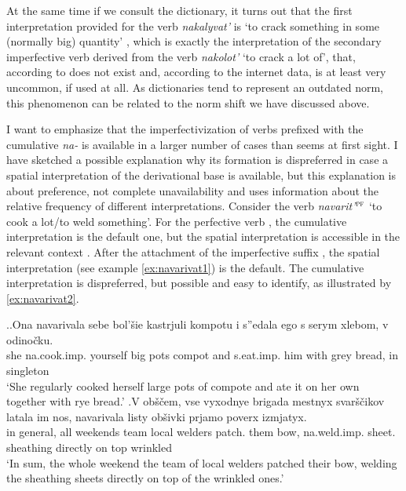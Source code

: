 At the same time if we consult the dictionary, it turns out that the first interpretation provided for the verb \textit{nakalyvat'} is `to crack something in some (normally big) quantity' \citep{Efremova:00}, which is exactly the interpretation of the secondary imperfective  verb  derived from the verb \textit{nakolot'} `to crack a lot of', that, according to \citet{Svenonius:04b} does not exist and, according to the internet data, is at least very uncommon, if used at all. As dictionaries tend to represent an outdated norm, this phenomenon can be related to the norm shift we have discussed above.

I want to emphasize that the imperfectivization  of verbs prefixed with the cumulative  \textit{na-}   is available in a larger number of cases than seems at first sight. I have sketched a possible explanation why its formation is dispreferred in case a spatial  interpretation of the derivational base is available, but this explanation is about preference, not complete unavailability and uses information about the relative frequency of different interpretations. Consider the verb \textit{navarit'}$^{\textsc{pf}}$ `to cook a lot/to weld something'. For the perfective verb , the cumulative  interpretation is the default one, but the spatial  interpretation is accessible in the relevant context  . After the attachment of the imperfective suffix  , the spatial  interpretation (see example \ref{ex:navarivat1}) is the default. The cumulative  interpretation is dispreferred, but possible and easy to identify, as illustrated by \ref{ex:navarivat2}.

\ex.\ag.\label{ex:navarivat2}Ona navarivala sebe bol'\v{s}ie kastrjuli kompotu i s''edala ego s serym xlebom, v odino\v{c}ku.\\
she na.cook.imp. yourself big pots compot and s.eat.imp. him with grey bread, in singleton\\
\trans `She regularly cooked herself large pots of compote and ate it on her own together with rye bread.'
\bg.\label{ex:navarivat1}V ob\v{s}\v{c}em, vse vyxodnye brigada mestnyx svar\v{s}\v{c}ikov latala im nos, navarivala listy ob\v{s}ivki prjamo poverx izmjatyx.\\
in general, all weekends team local welders patch. them bow, na.weld.imp. sheet. sheathing directly {on top} wrinkled\\
\trans `In sum, the whole weekend the team of local welders patched their bow, welding the sheathing sheets directly on top of the wrinkled ones.'

